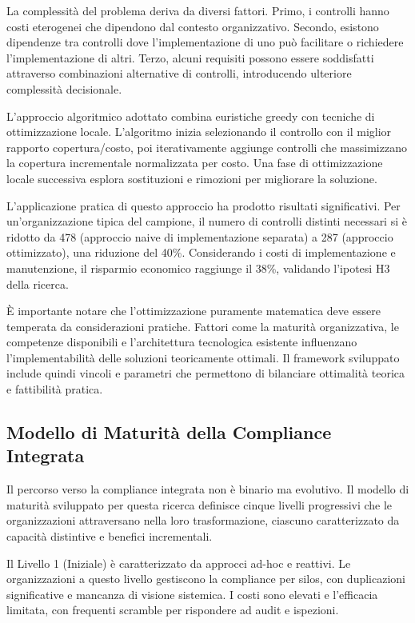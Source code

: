 La complessità del problema deriva da diversi fattori. Primo, i controlli hanno costi eterogenei che dipendono dal contesto organizzativo. Secondo, esistono dipendenze tra controlli dove l'implementazione di uno può facilitare o richiedere l'implementazione di altri. Terzo, alcuni requisiti possono essere soddisfatti attraverso combinazioni alternative di controlli, introducendo ulteriore complessità decisionale.

L'approccio algoritmico adottato combina euristiche greedy con tecniche di ottimizzazione locale. L'algoritmo inizia selezionando il controllo con il miglior rapporto copertura/costo, poi iterativamente aggiunge controlli che massimizzano la copertura incrementale normalizzata per costo. Una fase di ottimizzazione locale successiva esplora sostituzioni e rimozioni per migliorare la soluzione.

L'applicazione pratica di questo approccio ha prodotto risultati significativi. Per un'organizzazione tipica del campione, il numero di controlli distinti necessari si è ridotto da 478 (approccio naive di implementazione separata) a 287 (approccio ottimizzato), una riduzione del 40\%. Considerando i costi di implementazione e manutenzione, il risparmio economico raggiunge il 38\%, validando l'ipotesi H3 della ricerca.

È importante notare che l'ottimizzazione puramente matematica deve essere temperata da considerazioni pratiche. Fattori come la maturità organizzativa, le competenze disponibili e l'architettura tecnologica esistente influenzano l'implementabilità delle soluzioni teoricamente ottimali. Il framework sviluppato include quindi vincoli e parametri che permettono di bilanciare ottimalità teorica e fattibilità pratica.

\subsection{Modello di Maturità della Compliance Integrata}

Il percorso verso la compliance integrata non è binario ma evolutivo. Il modello di maturità sviluppato per questa ricerca definisce cinque livelli progressivi che le organizzazioni attraversano nella loro trasformazione, ciascuno caratterizzato da capacità distintive e benefici incrementali.

Il Livello 1 (Iniziale) è caratterizzato da approcci ad-hoc e reattivi. Le organizzazioni a questo livello gestiscono la compliance per silos, con duplicazioni significative e mancanza di visione sistemica. I costi sono elevati e l'efficacia limitata, con frequenti scramble per rispondere ad audit e ispezioni.


